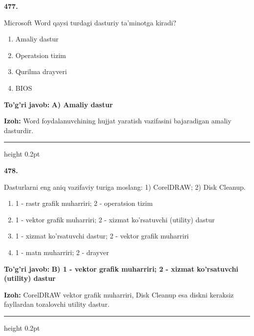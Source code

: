 \documentclass[10pt,a4paper]{article}
\begin{document}
{\bfseries\sffamily\color{ink} 477.}
\par
Microsoft Word qaysi turdagi dasturiy ta'minotga kiradi?
\begin{enumerate}[label=\Alph*),leftmargin=9mm]
\item Amaliy dastur
\item Operatsion tizim
\item Qurilma drayveri
\item BIOS
\end{enumerate}
\begin{tcolorbox}[enhanced,breakable,colback=teal!4,colframe=teal!60!black,boxrule=0.45pt,arc=1.2mm,left=2.7mm,right=2.7mm,top=1.8mm,bottom=1.8mm,before skip=2mm,after skip=2mm]
{\bfseries\sffamily\color{teal}To'g'ri javob:} \textbf{A) Amaliy dastur}
\par\smallskip
{\bfseries Izoh:} Word foydalanuvchining hujjat yaratish vazifasini bajaradigan amaliy dasturdir.
\end{tcolorbox}
\vspace{2mm}\hrule height 0.2pt\vspace{3mm}

{\bfseries\sffamily\color{ink} 478.}
\par
Dasturlarni eng aniq vazifaviy turiga moslang: 1) CorelDRAW; 2) Disk Cleanup.
\begin{enumerate}[label=\Alph*),leftmargin=9mm]
\item 1 - rastr grafik muharriri; 2 - operatsion tizim
\item 1 - vektor grafik muharriri; 2 - xizmat ko'rsatuvchi (utility) dastur
\item 1 - xizmat ko'rsatuvchi dastur; 2 - vektor grafik muharriri
\item 1 - matn muharriri; 2 - drayver
\end{enumerate}
\begin{tcolorbox}[enhanced,breakable,colback=teal!4,colframe=teal!60!black,boxrule=0.45pt,arc=1.2mm,left=2.7mm,right=2.7mm,top=1.8mm,bottom=1.8mm,before skip=2mm,after skip=2mm]
{\bfseries\sffamily\color{teal}To'g'ri javob:} \textbf{B) 1 - vektor grafik muharriri; 2 - xizmat ko'rsatuvchi (utility) dastur}
\par\smallskip
{\bfseries Izoh:} CorelDRAW vektor grafik muharriri, Disk Cleanup esa diskni keraksiz fayllardan tozalovchi utility dastur.
\end{tcolorbox}
\vspace{2mm}\hrule height 0.2pt\vspace{3mm}
\end{document}
